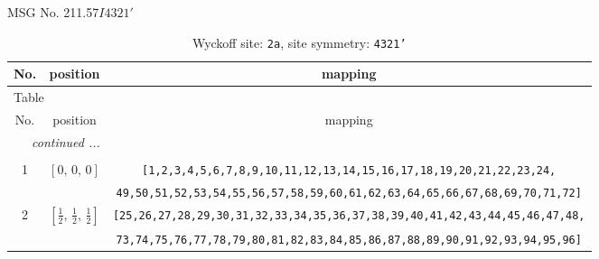 \documentclass[fleqn,8pt]{jsarticle}
\begin{document}
\setcounter{MaxMatrixCols}{32}

\renewcommand{\tablename}{Table~}
\renewcommand{\figurename}{Figure~}
\begin{center}
\LARGE
MSG No. 211.57\quad$I4321'$
\end{center}
\renewcommand{\arraystretch}{1.2}
\begin{longtable}{ccc}
\caption{Wyckoff site: {\tt 2a}, site symmetry: {\tt 4321'}}
 \\
 \hline \hline
No. & position & mapping \\ \hline \endfirsthead

\multicolumn{2}{l}{\tablename\ \thetable{}} \\
 \hline \hline
No. & position & mapping \\ \hline \endhead

 \hline \hline
\multicolumn{2}{r}{\footnotesize\it continued ...} \\ \endfoot

 \hline \hline
\multicolumn{2}{r}{} \\ \endlastfoot

1 & $\left[ 0,\, 0,\, 0 \right]$ & {\tt [1,2,3,4,5,6,7,8,9,10,11,12,13,14,15,16,17,18,19,20,21,22,23,24,} \\ \hline
 &  & {\tt 49,50,51,52,53,54,55,56,57,58,59,60,61,62,63,64,65,66,67,68,69,70,71,72]} \\ \hline
2 & $\left[ \frac{1}{2},\, \frac{1}{2},\, \frac{1}{2} \right]$ & {\tt [25,26,27,28,29,30,31,32,33,34,35,36,37,38,39,40,41,42,43,44,45,46,47,48,} \\ \hline
 &  & {\tt 73,74,75,76,77,78,79,80,81,82,83,84,85,86,87,88,89,90,91,92,93,94,95,96]} \\
\end{longtable}
\renewcommand{\arraystretch}{1.2}
\end{document}
